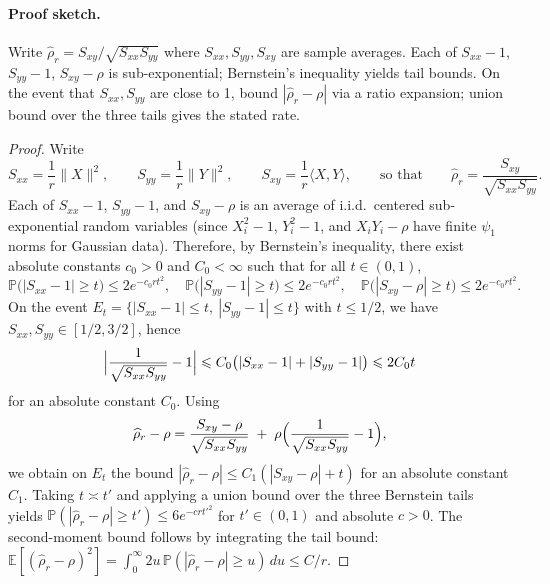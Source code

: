 \paragraph{Proof sketch.} Write \(\widehat{\rho}_r=S_{xy}/\sqrt{S_{xx}S_{yy}}\) where \(S_{xx},S_{yy},S_{xy}\) are sample averages. Each of \(S_{xx}-1\), \(S_{yy}-1\), \(S_{xy}-\rho\) is sub-exponential; Bernstein's inequality yields tail bounds. On the event that \(S_{xx},S_{yy}\) are close to 1, bound \(|\widehat{\rho}_r-\rho|\) via a ratio expansion; union bound over the three tails gives the stated rate.
\begin{proof}
Write
\[
S_{xx}=\frac{1}{r}\|X\|^2,\qquad S_{yy}=\frac{1}{r}\|Y\|^2,\qquad S_{xy}=\frac{1}{r}\langle X,Y\rangle,
\qquad\text{so that}\qquad
\widehat{\rho}_r=\frac{S_{xy}}{\sqrt{S_{xx}S_{yy}}}.
\]
Each of \(S_{xx}-1\), \(S_{yy}-1\), and \(S_{xy}-\rho\) is an average of i.i.d.\ centered sub-exponential random variables (since \(X_i^2-1\), \(Y_i^2-1\), and \(X_iY_i-\rho\) have finite \(\psi_1\) norms for Gaussian data). Therefore, by Bernstein's inequality, there exist absolute constants \(c_0>0\) and \(C_0<\infty\) such that for all \(t\in(0,1)\),
\[
\mathbb{P}\big(|S_{xx}-1|\ge t\big)\le 2e^{-c_0 r t^2},\quad
\mathbb{P}\big(|S_{yy}-1|\ge t\big)\le 2e^{-c_0 r t^2},\quad
\mathbb{P}\big(|S_{xy}-\rho|\ge t\big)\le 2e^{-c_0 r t^2}.
\]
On the event \(E_t=\{|S_{xx}-1|\le t,\ |S_{yy}-1|\le t\}\) with \(t\le 1/2\), we have \(S_{xx},S_{yy}\in[1/2,3/2]\), hence
\[
\Bigl|\frac{1}{\sqrt{S_{xx}S_{yy}}}-1\Bigr|
\le C_0\big(|S_{xx}-1|+|S_{yy}-1|\big)
\le 2C_0 t
\]
for an absolute constant \(C_0\). Using
\[
\widehat{\rho}_r-\rho
=\frac{S_{xy}-\rho}{\sqrt{S_{xx}S_{yy}}}
\;+\;\rho\Bigl(\frac{1}{\sqrt{S_{xx}S_{yy}}}-1\Bigr),
\]
we obtain on \(E_t\) the bound \(|\widehat{\rho}_r-\rho|\le C_1(|S_{xy}-\rho|+t)\) for an absolute constant \(C_1\). Taking \(t\asymp t'\) and applying a union bound over the three Bernstein tails yields \(\mathbb{P}(|\widehat{\rho}_r-\rho|\ge t')\le 6e^{-c r t'^2}\) for \(t'\in(0,1)\) and absolute \(c>0\).
The second-moment bound follows by integrating the tail bound: \(\mathbb{E}[(\widehat{\rho}_r-\rho)^2]=\int_0^\infty 2u\,\mathbb{P}(|\widehat{\rho}_r-\rho|\ge u)\,du\le C/r\).
\end{proof}

